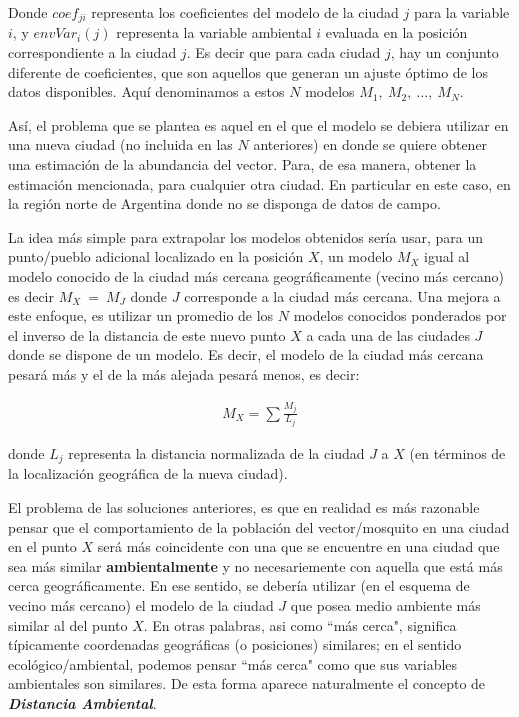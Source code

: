  \par Donde $coef_{ji}$ representa los coeficientes del modelo de la
    ciudad $j$ para la variable $i$, y $envVar_{i}(j)$ representa la variable
    ambiental $i$ evaluada en la posición correspondiente a la ciudad $j$.
    Es decir que para cada ciudad $j$, hay un conjunto diferente de
    coeficientes, que son aquellos que generan un ajuste óptimo de los datos
    disponibles. Aquí denominamos a estos $N$ modelos $M_{1},\ M_{2},\ \dots,\ M_{N}$.


  \par Así, el problema que se plantea es aquel en el que el modelo se
    debiera utilizar en una nueva ciudad (no incluida en las $N$ anteriores) en
    donde se quiere obtener una estimación de la abundancia del vector.
    Para, de esa manera, obtener la estimación mencionada, para cualquier otra
    ciudad. En particular en este caso, en la región norte de Argentina donde
    no se disponga de datos de campo.


  \par La idea más simple para extrapolar los modelos obtenidos sería usar,
    para un punto/pueblo adicional localizado en la posición $X$, un modelo $M_{X}$
    igual al modelo conocido de la ciudad más cercana geográficamente (vecino más cercano) es
    decir $M_{X}\ =\ M_{J}$ donde $J$ corresponde a la ciudad más cercana.
    Una mejora a este enfoque, es utilizar un promedio de los $N$ modelos conocidos
    ponderados por el inverso de la distancia de este nuevo punto $X$ a cada una
    de las ciudades $J$ donde se dispone de un modelo. Es decir, el modelo de la
    ciudad más cercana pesará más y el de la más alejada pesará menos, es decir:

    \begin{align}
      M_{X} = \sum{}{\frac{M_{j}}{L_{j}}} \label{Eq:dist}
    \end{align}

    donde $L_{j}$ representa la distancia normalizada de la ciudad $J$ a
    $X$ (en términos de la localización geográfica de la nueva ciudad).


  \par El problema de las soluciones anteriores, es que en realidad es más
    razonable pensar que el comportamiento de la población del vector/mosquito
    en una ciudad en el punto $X$ será más coincidente con una que se encuentre
    en una ciudad que sea más similar \textbf{ambientalmente} y no necesariemente
    con aquella que está más cerca geográficamente. En ese sentido, se debería
    utilizar (en el esquema de vecino más cercano) el modelo de la ciudad $J$
    que posea medio ambiente más similar al del punto $X$. En otras palabras,
    asi como ``más cerca", significa típicamente coordenadas geográficas (o posiciones)
    similares; en el sentido ecológico/ambiental, podemos pensar ``más cerca"
    como que sus variables ambientales son similares. De esta forma aparece
    naturalmente el concepto de \textbf{\textit{Distancia Ambiental}}.

